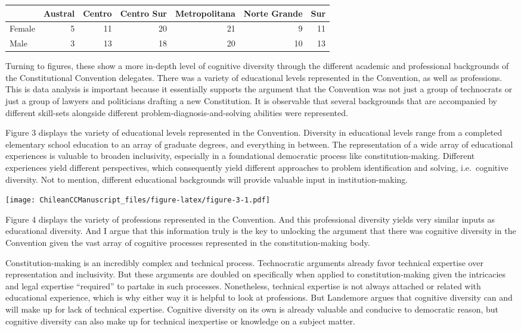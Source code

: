 \documentclass[
]{article}
\begin{document}
\begin{longtable}[]{@{}lrrrrrr@{}}
\toprule()
& Austral & Centro & Centro Sur & Metropolitana & Norte Grande & Sur \\
\midrule()
\endhead
Female & 5 & 11 & 20 & 21 & 9 & 11 \\
Male & 3 & 13 & 18 & 20 & 10 & 13 \\
\bottomrule()
\end{longtable}

Turning to figures, these show a more in-depth level of cognitive
diversity through the different academic and professional backgrounds of
the Constitutional Convention delegates. There was a variety of
educational levels represented in the Convention, as well as
professions. This is data analysis is important because it essentially
supports the argument that the Convention was not just a group of
technocrats or just a group of lawyers and politicians drafting a new
Constitution. It is observable that several backgrounds that are
accompanied by different skill-sets alongside different
problem-diagnosis-and-solving abilities were represented.

Figure 3 displays the variety of educational levels represented in the
Convention. Diversity in educational levels range from a completed
elementary school education to an array of graduate degrees, and
everything in between. The representation of a wide array of educational
experiences is valuable to broaden inclusivity, especially in a
foundational democratic process like constitution-making. Different
experiences yield different perspectives, which consequently yield
different approaches to problem identification and solving,
i.e.~cognitive diversity. Not to mention, different educational
backgrounds will provide valuable input in institution-making.

\texttt{[image: ChileanCCManuscript\_files/figure-latex/figure-3-1.pdf]}

Figure 4 displays the variety of professions represented in the
Convention. And this professional diversity yields very similar inputs
as educational diversity. And I argue that this information truly is the
key to unlocking the argument that there was cognitive diversity in the
Convention given the vast array of cognitive processes represented in
the constitution-making body.

Constitution-making is an incredibly complex and technical process.
Technocratic arguments already favor technical expertise over
representation and inclusivity. But these arguments are doubled on
specifically when applied to constitution-making given the intricacies
and legal expertise ``required'' to partake in such processes.
Nonetheless, technical expertise is not always attached or related with
educational experience, which is why either way it is helpful to look at
professions. But Landemore argues that cognitive diversity can and will
make up for lack of technical expertise. Cognitive diversity on its own
is already valuable and conducive to democratic reason, but cognitive
diversity can also make up for technical inexpertise or knowledge on a
subject matter.
\end{document}
